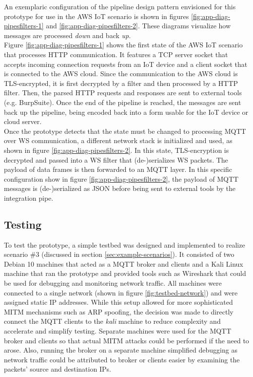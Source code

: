 An exemplaric configuration of the pipeline design pattern envisioned for this prototype for use in the \ac{AWS} \ac{IoT} scenario is shown in figures \ref{fig:app-diag-pipesfilters-1} and \ref{fig:app-diag-pipesfilters-2}. These diagrams visualize how messages are processed \emph{down} and back \emph{up}.\\
Figure \ref{fig:app-diag-pipesfilters-1} shows the first state of the \ac{AWS} \ac{IoT} scenario that processes \ac{HTTP} communication. It features a TCP server socket that accepts incoming connection requests from an \ac{IoT} device and a client socket that is connected to the \ac{AWS} cloud. Since the communication to the \ac{AWS} cloud is \ac{TLS}-encrypted, it is first decrypted by a filter and then processed by a \ac{HTTP} filter. Then, the parsed \ac{HTTP} requests and responses are sent to external tools (e.g. BurpSuite). Once the end of the pipeline is reached, the messages are sent back up the pipeline, being encoded back into a form usable for the \ac{IoT} device or cloud server.\\
Once the prototype detects that the state must be changed to processing \ac{MQTT} over \ac{WS} communication, a different network stack is initialized and used, as shown in figure \ref{fig:app-diag-pipesfilters-2}. In this state, TLS-encryption is decrypted and passed into a \ac{WS} filter that (de-)serializes \ac{WS} packets. The payload of data frames is then forwarded to an \ac{MQTT} layer. In this specific configuration show in figure \ref{fig:app-diag-pipesfilters-2}, the payload of \ac{MQTT} messages is (de-)serialized as \ac{JSON} before being sent to external tools by the integration pipe.

\subsection{Testing}
\label{sec:prototype-testing}
To test the prototype, a simple testbed was designed and implemented to realize scenario \#3 (discussed in section \ref{sec:example-scenarios}). It consisted of two Debian 10 machines that acted as a \ac{MQTT} broker and clients and a Kali Linux machine that ran the prototype and provided tools such as Wireshark that could be used for debugging and monitoring network traffic. All machines were connected to a single network (shown in figure \ref{fig:testbed-network}) and were assigned static \ac{IP} addresses. While this setup allowed for more sophisticated \ac{MITM} mechanisms such as \ac{ARP} spoofing, the decision was made to directly connect the \ac{MQTT} clients to the \emph{kali} machine to reduce complexity and accelerate and simplify testing. Separate machines were used for the \ac{MQTT} broker and clients so that actual \ac{MITM} attacks could be performed if the need to arose. Also, running the broker on a separate machine simplified debugging as network traffic could be attributed to broker or clients easier by examining the packets' source and destination \acp{IP}.\par

